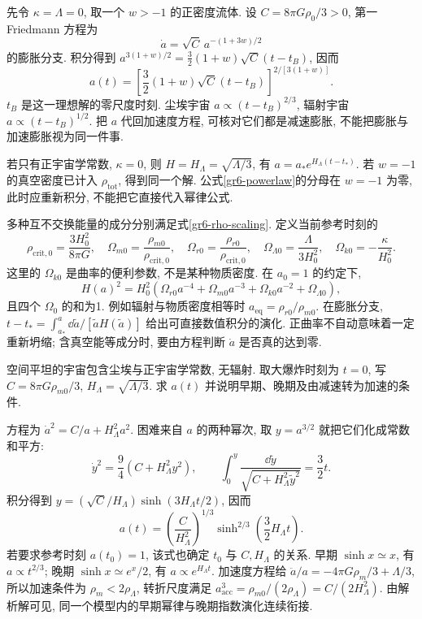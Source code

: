 
先令 $\kappa=\Lambda=0$, 取一个 $w>-1$ 的正密度流体. 设 $C=8\pi G\rho_0/3>0$, 第一 Friedmann 方程为
\[
 \dot a=\sqrt C\,a^{-(1+3w)/2}
\]
的膨胀分支. 积分得到 $a^{3(1+w)/2}=\tfrac32(1+w)\sqrt C(t-t_B)$, 因而
\begin{equation}\label{gr6-powerlaw}
 a(t)=\left[\frac32(1+w)\sqrt C(t-t_B)\right]^{2/[3(1+w)]}.
\end{equation}
$t_B$ 是这一理想解的零尺度时刻. 尘埃宇宙 $a\propto(t-t_B)^{2/3}$, 辐射宇宙 $a\propto(t-t_B)^{1/2}$. 把 $a$ 代回加速度方程, 可核对它们都是减速膨胀, 不能把膨胀与加速膨胀视为同一件事.

若只有正宇宙学常数, $\kappa=0$, 则 $H=H_\Lambda=\sqrt{\Lambda/3}$, 有 $a=a_*e^{H_\Lambda(t-t_*)}$. 若 $w=-1$ 的真空密度已计入 $\rho_{\mathrm{tot}}$, 得到同一个解. 公式\eqref{gr6-powerlaw}的分母在 $w=-1$ 为零, 此时应重新积分, 不能把它直接代入幂律公式.

多种互不交换能量的成分分别满足式\eqref{gr6-rho-scaling}. 定义当前参考时刻的
\[
 \rho_{\mathrm{crit},0}=\frac{3H_0^2}{8\pi G},\quad
 \Omega_{m0}=\frac{\rho_{m0}}{\rho_{\mathrm{crit},0}},\quad
 \Omega_{r0}=\frac{\rho_{r0}}{\rho_{\mathrm{crit},0}},\quad
 \Omega_{\Lambda0}=\frac{\Lambda}{3H_0^2},\quad
 \Omega_{k0}=-\frac\kappa{H_0^2}.
\]
这里的 $\Omega_{k0}$ 是曲率的便利参数, 不是某种物质密度. 在 $a_0=1$ 的约定下,
\begin{equation}\label{gr6-h-mixture}
 H(a)^2=H_0^2(\Omega_{r0}a^{-4}+\Omega_{m0}a^{-3}
                   +\Omega_{k0}a^{-2}+\Omega_{\Lambda0}),
\end{equation}
且四个 $\Omega_0$ 的和为1. 例如辐射与物质密度相等时 $a_{\mathrm{eq}}=\rho_{r0}/\rho_{m0}$. 在膨胀分支, $t-t_* =\int_{a_*}^a\dd\tilde a/[\tilde a H(\tilde a)]$ 给出可直接数值积分的演化. 正曲率不自动意味着一定重新坍缩; 含真空能等成分时, 要由方程判断 $\dot a$ 是否真的达到零.

\begin{example}
空间平坦的宇宙包含尘埃与正宇宙学常数, 无辐射. 取大爆炸时刻为 $t=0$, 写 $C=8\pi G\rho_{m0}/3$, $H_\Lambda=\sqrt{\Lambda/3}$. 求 $a(t)$ 并说明早期、晚期及由减速转为加速的条件.
\end{example}
\begin{solution}
方程为 $\dot a^2=C/a+H_\Lambda^2a^2$. 困难来自 $a$ 的两种幂次, 取 $y=a^{3/2}$ 就把它们化成常数和平方:
\[
 \dot y^2=\frac94(C+H_\Lambda^2y^2),\qquad
 \int_0^y\frac{\dd\tilde y}{\sqrt{C+H_\Lambda^2\tilde y^2}}=\frac32t.
\]
积分得到 $y=(\sqrt C/H_\Lambda)\sinh(3H_\Lambda t/2)$, 因而
\[
 a(t)=\left(\frac C{H_\Lambda^2}\right)^{1/3}
                  \sinh^{2/3}\left(\frac32H_\Lambda t\right).
\]
若要求参考时刻 $a(t_0)=1$, 该式也确定 $t_0$ 与 $C,H_\Lambda$ 的关系. 早期 $\sinh x\simeq x$, 有 $a\propto t^{2/3}$; 晚期 $\sinh x\simeq e^x/2$, 有 $a\propto e^{H_\Lambda t}$. 加速度方程给 $\ddot a/a=-4\pi G\rho_m/3+\Lambda/3$, 所以加速条件为 $\rho_m<2\rho_\Lambda$, 转折尺度满足 $a_{\mathrm{acc}}^3=\rho_{m0}/(2\rho_\Lambda)=C/(2H_\Lambda^2)$. 由解析解可见, 同一个模型内的早期幂律与晚期指数演化连续衔接.
\end{solution}


